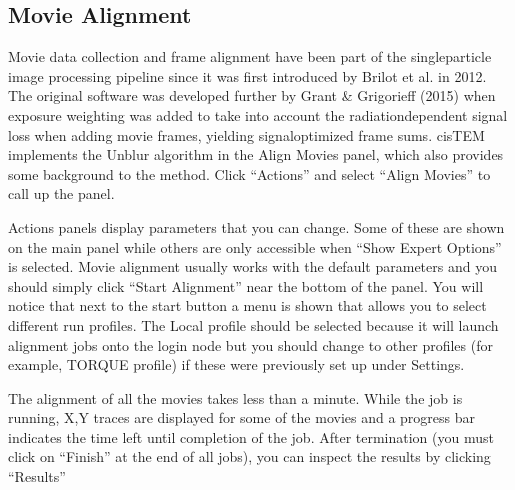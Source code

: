 \documentclass[a4paper,11pt,english]{sphinxmanual}
\begin{document}


\subsection{Movie Alignment}
\label{\detokenize{cisTEM:movie-alignment}}
\sphinxAtStartPar
Movie data collection and frame alignment have been part of the single\sphinxhyphen{}particle image processing pipeline since it was first introduced by Brilot et al. in 2012. The original software  was developed further by Grant \& Grigorieff (2015) when exposure weighting was added to take into account the radiation\sphinxhyphen{}dependent signal loss when adding movie frames, yielding signal\sphinxhyphen{}optimized frame sums. cisTEM implements the Unblur algorithm in the Align Movies panel, which also provides some background to the method. Click “Actions” and select “Align Movies” to call up the panel.


\sphinxAtStartPar
Actions panels display parameters that you can change. Some of these are shown on the main panel while others are only accessible when “Show Expert Options” is selected.
Movie alignment usually works with the default parameters and you should simply click “Start Alignment” near the bottom of the panel.
You will notice that next to the start button a menu is shown that allows you to select different run profiles.
The Local profile should  be selected because it will launch alignment jobs onto the login node but you should change to other profiles (for example, TORQUE profile)
if these were previously set up under Settings.

\sphinxAtStartPar
The alignment of all the  movies takes less than a minute. While the job is running, X,Y traces are displayed for some of the movies and a progress bar indicates the time left until completion of the job.
After termination (you must click on “Finish” at the end of all jobs), you can inspect the results by clicking “Results”

\end{document}
